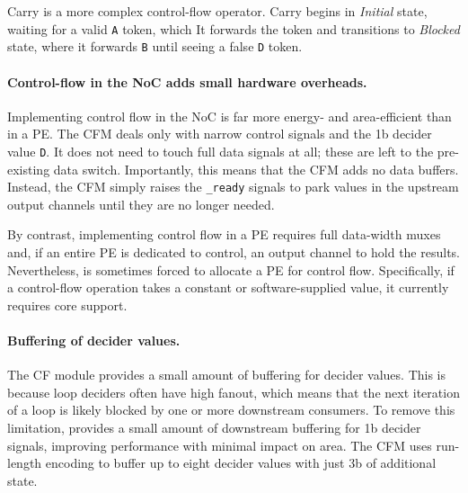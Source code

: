 Carry is a more complex control-flow operator.
%
Carry begins in {\em Initial} state, waiting for a valid {\tt A}
token, which
%
It forwards the token and transitions to {\em Blocked} state, where
it forwards {\tt B} until seeing a false {\tt D} token.
%

\paragraph{Control-flow in the NoC adds small hardware overheads.}
%
Implementing control flow in the NoC is far more energy- and
area-efficient than in a PE.
%
The CFM deals only with narrow control signals and the 1b decider
value {\tt D}.
%
It does not need to touch full data signals at all; these are
left to the pre-existing data switch.
%
Importantly, this means that the CFM adds no data buffers.
%
Instead, the CFM simply raises the {\tt *\_ready} signals to park
values in the upstream output channels until they are no longer
needed.

By contrast, implementing control flow in a PE requires full
data-width muxes and, if an entire PE is dedicated to control, an
output channel to hold the results.
%
Nevertheless, \riptide is sometimes forced to allocate a PE for control
flow.
%
Specifically, if a control-flow operation takes a constant or
software-supplied value, it currently requires \textmu core
support.

\paragraph{Buffering of decider values.}
The CF module provides a small amount of buffering for decider values.
% 
This is because loop deciders often have high fanout, which means that the next iteration of a loop is likely blocked by one or more downstream consumers.
% 
To remove this limitation, \riptide provides a small amount of downstream buffering for 1b decider signals, improving performance with minimal impact on area.
%
The CFM uses run-length encoding to buffer up to eight decider values with just 3b of additional state.
